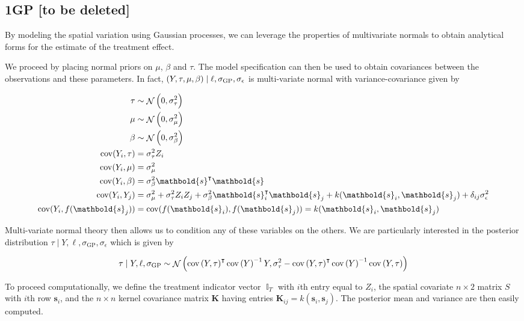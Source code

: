 \documentclass[letter]{article}
\DeclareMathOperator{\cov}{{cov}}
\DeclareMathOperator{\Ind}{\mathbb{I}}
\DeclareMathOperator{\normal}{\mathcal{N}}
\newcommand{\trans}{^{\intercal}}
\newcommand{\sigmaf}{\sigma_{\mathrm{GP}}}
\newcommand{\sigman}{\sigma_{\epsilon}}
\newcommand{\sigmatau}{\sigma_{\tau}}
\newcommand{\sigmabeta}{\sigma_{\beta}}
\newcommand{\sigmamu}{\sigma_{\mu}}
\newcommand{\svec}{\mathbold{s}}
\newcommand{\vectreat}{\Ind_{T}}
\newcommand{\K}{\mathbf{K}}
\begin{document}
    	\subsection{1GP {[}to be deleted{]}}\label{gp-to-be-deleted}

By modeling the spatial variation using Gaussian processes, we can leverage the properties of multivariate normals to obtain analytical forms for the estimate of the treatment effect.

We proceed by placing normal priors on \(\mu\), \(\beta\) and \(\tau\). The model specification can then be used to obtain covariances between the observations and these parameters. In fact, \(\del{Y,\tau,\mu,\beta} \mid \ell,\sigmaf, \sigman\) is multi-variate normal with variance-covariance given by

\begin{equation}
\begin{split}
    \tau  &\sim \normal\del{0,\sigmatau^2} \\
    \mu   &\sim \normal\del{0,\sigmamu^2} \\
    \beta &\sim \normal\del{0,\sigmabeta^2} \\
    \cov(Y_i,\tau) &= \sigmatau^2 Z_i \\
    \cov(Y_i,\mu)  &= \sigmamu^2 \\
    \cov(Y_i,\beta)&= \sigmabeta^2 \svec\trans \svec \\
    \cov(Y_i,Y_j)&= \sigmamu^2 + \sigmatau^2 Z_i Z_j + \sigmabeta^2 \svec_i\trans \svec_j + k(\svec_i,\svec_j) + \delta_{ij}\sigman^2\\
    \cov(Y_i,f(\svec_j)) &= \cov(f(\svec_i),f(\svec_j)) = k(\svec_i,\svec_j)
\end{split}
\end{equation}

Multi-variate normal theory then allows us to condition any of these variables on the others. We are particularly interested in the posterior distribution \(\tau \mid Y, \ell, \sigmaf, \sigman\) which is given by

\begin{equation}
    \tau \mid Y, \ell, \sigmaf \sim \normal\del{\cov\del{Y,\tau}\trans \cov\del{Y}^{-1} Y, \sigma_\tau^2 - \cov\del{Y,\tau}\trans \cov\del{Y}^{-1} \cov\del{Y,\tau}}
\end{equation}

To proceed computationally, we define the treatment indicator vector \(\vectreat\) with \(i\)th entry equal to \(Z_i\), the spatial covariate \(n \times 2\) matrix \(S\) with \(i\)th row \(\svec_i\), and the \(n \times n\) kernel covariance matrix \(\K\) having entries \(\K_{ij}=k(\svec_i, \svec_j)\). The posterior mean and variance are then easily computed.
\end{document}
